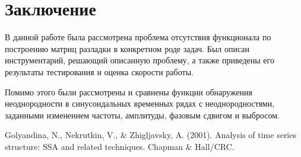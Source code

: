 \documentclass[specialist, substylefile = spbu.rtx,
			   subf, href, 12pt]{disser}
\begin{document}
\newpage
\chapter*{Заключение}

В данной работе была рассмотрена проблема отсутствия функционала по построению матриц разладки в конкретном роде задач. Был описан инструментарий, решающий описанную проблему, а также приведены его результаты тестирования и оценка скорости работы. 

Помимо этого были рассмотрены и сравнены функции обнаружения неоднородности в синусоидальных временных рядах с неоднородностями, заданными изменением частоты, амплитуды, фазовым сдвигом и выбросом.




\begin{thebibliography}{3}
	Golyandina, N., Nekrutkin, V., \& Zhigljavsky, A. (2001). Analysis of time series structure: SSA and related techniques. Chapman \& Hall/CRC.
\end{thebibliography}

	
\end{document}
